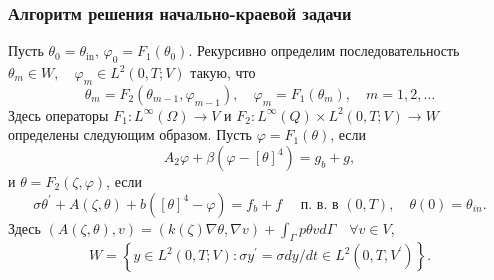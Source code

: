 \begin{frame}
    \frametitle{Алгоритм решения начально-краевой задачи}
    Пусть $\theta_{0}=\theta_{\text{in}}, \, \varphi_{0}=F_{1}\left(\theta_{0}\right)$.
    Рекурсивно определим последовательность
    $\theta_{m} \in W, \quad \varphi_{m} \in L^{2}(0, T ; V)$ такую, что
    \begin{equation}
        \label{eq:1_6:10}
        \theta_{m}=F_{2}\left(\theta_{m-1}, \varphi_{m-1}\right),
        \quad \varphi_{m}=F_{1}\left(\theta_{m}\right), \quad m=1,2, \ldots
    \end{equation}
    Здесь операторы $F_{1}: L^{\infty}(\Omega) \rightarrow V$ и
    $F_{2}: L^{\infty}(Q) \times L^{2}(0, T ; V) \rightarrow W$ определены следующим образом.
    Пусть $\varphi=F_{1}(\theta)$, если
    \begin{equation}
        \label{eq:1_6:6}
        A_{2} \varphi+\beta\left(\varphi-[\theta]^{4}\right)=g_{b}+g,
    \end{equation}
    и $\theta=F_{2}(\zeta, \varphi)$, если
    \begin{equation}
        \label{eq:1_6:7}
        \sigma \theta^{\prime}+A(\zeta, \theta)
        +b\left([\theta]^{4}-\varphi\right)=f_{b}+f
        \quad \text { п. в. в }(0, T), \quad \theta(0)=\theta_{i n}.
    \end{equation}
    Здесь
    $ (A(\zeta, \theta), v)=(k(\zeta) \nabla \theta, \nabla v) +\int_{\Gamma} p \theta v d \Gamma \quad \forall v \in V$,
    \[
        W=\left\{y \in L^{2}(0, T ; V): \sigma y^{\prime}=\sigma d y / d t \in L^{2}
        \left(0, T, V^{\prime}\right)\right\}.
    \]

\end{frame}

